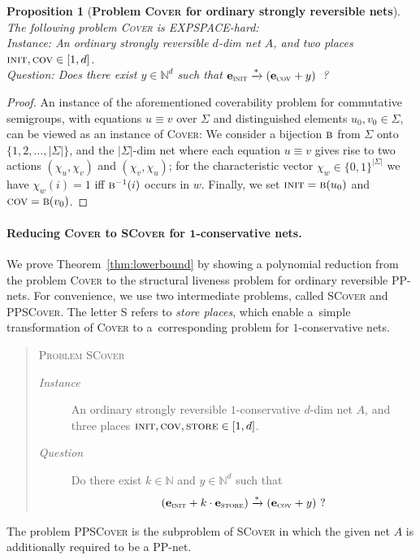 \documentclass[11pt,a4paper]{amsart}
\newcommand{\step}[1]{\mathrel{\xrightarrow{#1}}}
\newcommand{\reach}{\step{*}}
\newcommand{\Cover}{\textsc{Cover}\xspace}
\newcommand{\SCover}{\textsc{SCover}\xspace}
\newcommand{\PPSCover}{\textsc{PPSCover}\xspace}
\newcommand{\EXPSPACE}{EXPSPACE}
\newcommand{\Nat}{\mathbb{N}}
\newcommand{\ppnets}{PP-nets\xspace}
\newcommand{\pinit}{\textsc{init}}
\newcommand{\pcov}{\textsc{cov}}
\newcommand{\pstore}{\textsc{store}}
\newcommand{\setN}{\Nat}
\let\origtextsc\textsc
\renewcommand{\textsc}[1]{\textnormal{\origtextsc{#1}}}
\theoremstyle{plain}
\newtheorem{prop}[thm]{Proposition}
\theoremstyle{definition}
\theoremstyle{defC}
\theoremstyle{thmC}
\begin{document}
\begin{prop}[\textbf{Problem \Cover for ordinary strongly reversible
	nets}]\label{prop:problemcover}
\hfill\\	
	The following problem \Cover is \EXPSPACE-hard:
\\
Instance: An ordinary strongly reversible $d$-dim net $A$, and two places
	$\pinit,\pcov\in[1,d]$.
\\
	Question: Does there exist $y\in\setN^d$ such that $\mathbf{e}_\pinit\reach
	(\mathbf{e}_\pcov+y)$~?
\end{prop}
\begin{proof}
An instance of the aforementioned coverability problem for
	commutative semigroups, with equations $u\equiv v$ over
	$\Sigma$ and distinguished elements
	$u_0,v_0\in\Sigma$,
	can be viewed as an instance of \Cover: We consider a
	bijection $\textsc{b}$ from $\Sigma$
onto $\{1,2,\dots,|\Sigma|\}$, and the
$|\Sigma|$-dim net where each equation $u\equiv v$ gives rise to two
	actions $(\chi_u,\chi_v)$ and $(\chi_v,\chi_u)$; for the
	characteristic vector
	$\chi_w\in \{0,1\}^{|\Sigma|}$ we have $\chi_w(i)=1$ iff
	$\textsc{b}^{-1}(i)$ occurs in $w$. Finally, we set
	$\pinit=\textsc{b}(u_0)$ and $\pcov=\textsc{b}(v_0)$.
\end{proof}	

\paragraph{Reducing \Cover to \SCover for $\bm{1}$-conservative nets.}
We prove Theorem~\ref{thm:lowerbound} by showing a polynomial
reduction from the problem \textsc{Cover} to
the structural liveness problem for ordinary reversible \ppnets. For convenience, we use two intermediate problems, called \SCover
and \PPSCover. The letter \textsc{S} refers to \emph{store places}, 
which enable a~simple transformation of \Cover to a~corresponding
problem for $1$-conservative nets. 

\begin{quote}
    \textsc{Problem} \SCover
    \smallskip
\begin{description}
        \item[\emph{Instance}]
An ordinary strongly reversible $1$-conservative $d$-dim net $A$, and
three places $\pinit,\pcov,\pstore\in[1,d]$.
 \item[\emph{Question}]
	Do there exist $k\in\setN$ and $y\in\setN^d$ such that 
		\[(\mathbf{e}_\pinit+k\cdot \mathbf{e}_\pstore)\reach
		(\mathbf{e}_\pcov+y)~?\]
 \end{description}
 \end{quote}
The problem \PPSCover is the subproblem of \SCover in which the given
net $A$ is additionally required to be a PP-net.
\end{document}
